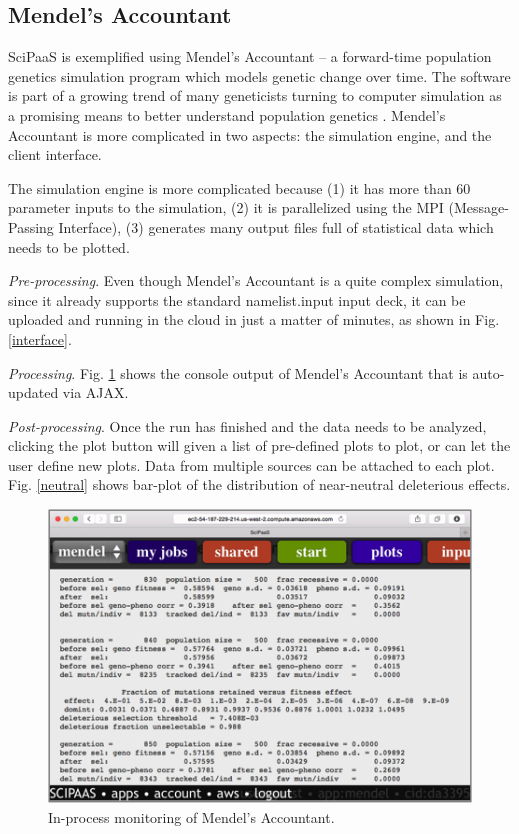 \documentclass[10pt,reprint]{socc14}
\begin{document}
\subsection{Mendel's Accountant}

SciPaaS is exemplified using Mendel’s Accountant – a forward-time population genetics simulation program which models genetic change over time.  The software is part of a growing trend of many geneticists turning to computer simulation as a promising means to better understand population genetics \cite{sanford12}. Mendel’s Accountant is more complicated in two aspects: the simulation engine, and the client interface.

The simulation engine is more complicated because (1) it has more than 60 parameter inputs to the simulation, (2) it is parallelized using the MPI (Message-Passing Interface), (3) generates many output files full of statistical data which needs to be plotted.

\textit{Pre-processing}. Even though Mendel’s Accountant is a quite complex simulation, since it already supports the standard namelist.input input deck, it can be uploaded and running in the cloud in just a matter of minutes, as shown in Fig. \ref{interface}.

\textit{Processing}.  Fig. \ref{output} shows the console output of Mendel’s Accountant that is auto-updated via AJAX.

\textit{Post-processing}.  Once the run has finished and the data needs to be analyzed, clicking the plot button will given a list of pre-defined plots to plot, or can let the user define new plots.  Data from multiple sources can be attached to each plot. Fig. \ref{neutral} shows bar-plot of the distribution of near-neutral deleterious effects.

\begin{figure}[t]
\centering
\includegraphics[natwidth=454,natheight=315]{figs/output.png}
\caption{In-process monitoring of Mendel’s Accountant. \label{output}}
\end{figure}
\end{document}
